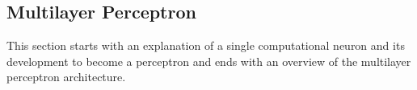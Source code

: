 \subsection{Multilayer Perceptron}
\label{sec:neural-networks-mlp}
This section starts with an explanation of a single computational neuron and its development to become a perceptron and ends with an overview of the multilayer perceptron architecture.

